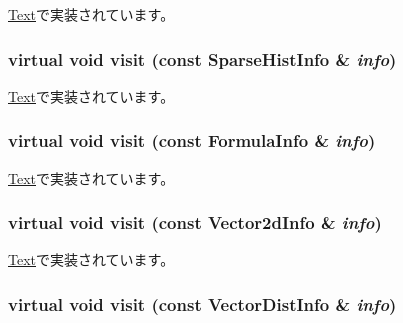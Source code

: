 \hyperlink{classStats_1_1Text_a8d985300b138b6c5556ab17ed4df3b38}{Text}で実装されています。\hypertarget{structStats_1_1Output_acab7797e495fae2af2e7a37cc9b5b0ce}{
\subsubsection[{visit}]{\setlength{\rightskip}{0pt plus 5cm}virtual void visit (const {\bf SparseHistInfo} \& {\em info})}}
\label{structStats_1_1Output_acab7797e495fae2af2e7a37cc9b5b0ce}


\hyperlink{classStats_1_1Text_a589b1491b14568a2285a6ee57465a639}{Text}で実装されています。\hypertarget{structStats_1_1Output_aee6a314df4bef5e9f26fdefb884620f5}{
\subsubsection[{visit}]{\setlength{\rightskip}{0pt plus 5cm}virtual void visit (const {\bf FormulaInfo} \& {\em info})}}
\label{structStats_1_1Output_aee6a314df4bef5e9f26fdefb884620f5}


\hyperlink{classStats_1_1Text_ad5ec5d0ac0a339061e845a2cb0232164}{Text}で実装されています。\hypertarget{structStats_1_1Output_ae8993423f40b8eca4bd2b1edf4670489}{
\subsubsection[{visit}]{\setlength{\rightskip}{0pt plus 5cm}virtual void visit (const {\bf Vector2dInfo} \& {\em info})}}
\label{structStats_1_1Output_ae8993423f40b8eca4bd2b1edf4670489}


\hyperlink{classStats_1_1Text_a2aae6a3b530f999b3d2bdd1882643e72}{Text}で実装されています。\hypertarget{structStats_1_1Output_a0f589846ed888d3e44db1185b6510bbb}{
\subsubsection[{visit}]{\setlength{\rightskip}{0pt plus 5cm}virtual void visit (const {\bf VectorDistInfo} \& {\em info})}}
\label{structStats_1_1Output_a0f589846ed888d3e44db1185b6510bbb}


